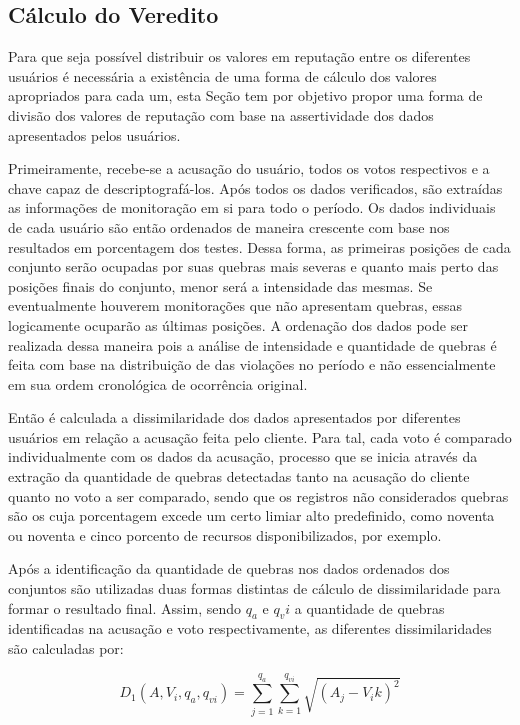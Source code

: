 \subsection{Cálculo do Veredito}
\label{subsec:calc_veredito}

Para que seja possível distribuir os valores em reputação entre os diferentes usuários é necessária a existência de uma forma de cálculo dos valores apropriados para cada um, esta Seção tem por objetivo propor uma forma de divisão dos valores de reputação com base na assertividade dos dados apresentados pelos usuários.

%
Primeiramente, recebe-se a acusação do usuário, todos os votos respectivos e a chave capaz de descriptografá-los. Após todos os dados verificados, são extraídas as informações de monitoração em si para todo o período. Os dados individuais de cada usuário são então ordenados de maneira crescente com base nos resultados em porcentagem dos testes. Dessa forma, as primeiras posições de cada conjunto serão ocupadas por suas quebras mais severas e quanto mais perto das posições finais do conjunto, menor será a intensidade das mesmas. Se eventualmente houverem monitorações que não apresentam quebras, essas logicamente ocuparão as últimas posições. A ordenação dos dados pode ser realizada dessa maneira pois a análise de intensidade e quantidade de quebras é feita com base na distribuição de das violações no período e não essencialmente em sua ordem cronológica de ocorrência original.

Então é calculada a dissimilaridade dos dados apresentados por diferentes usuários em relação a acusação feita pelo cliente. Para tal, cada voto é comparado individualmente com os dados da acusação, processo que se inicia através da extração da quantidade de quebras detectadas tanto na acusação do cliente quanto no voto a ser comparado, sendo que os registros não considerados quebras são os cuja porcentagem excede um certo limiar alto predefinido, como noventa ou noventa e cinco porcento de recursos disponibilizados, por exemplo. 

%
Após a identificação da quantidade de quebras nos dados ordenados dos conjuntos são utilizadas duas formas distintas de cálculo de dissimilaridade para formar o resultado final. Assim, sendo $q_a$ e $q_vi$ a quantidade de quebras identificadas na acusação e voto respectivamente, as diferentes dissimilaridades são calculadas por:

\begin{equation}
    D_1(A, V_i, q_a, q_{vi}) = \sum_{j = 1}^{q_a} \sum_{k = 1}^{q_{vi}} \sqrt{(A_j - V_ik)^2}
\end{equation}

